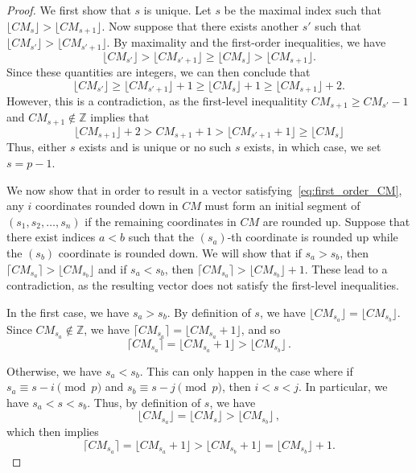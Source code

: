 \documentclass[12pt]{amsart}
\theoremstyle{definition}
\numberwithin{equation}{section}
\renewcommand\>{\rangle}
\newcommand\<{\langle}
\newcommand\0{\mathbf{0}}
\newcommand\ZZ{\mathbb{Z}}
\begin{document}
\begin{proof}
	We first show that $s$ is unique. Let $s$ be the maximal index such that $\lfloor CM_{s} \rfloor > \lfloor CM_{s+1} \rfloor$. Now suppose that there exists another $s'$ such that $\lfloor CM_{s'} \rfloor > \lfloor CM_{s'+1} \rfloor$. By maximality and the first-order inequalities, we have 
	\[\lfloor CM_{s'} \rfloor > \lfloor CM_{s'+1} \rfloor \geq \lfloor CM_{s} \rfloor > \lfloor CM_{s+1} \rfloor . \]
	Since these quantities are integers, we can then conclude that 
	\[
	\lfloor CM_{s'} \rfloor \geq \lfloor CM_{s'+1}\rfloor + 1 \geq \lfloor CM_{s}\rfloor  + 1 \geq \lfloor CM_{s+1}\rfloor + 2.\]
	However, this is a contradiction, as the first-level inequalitity $CM_{s+1} \geq CM_{s'} - 1$ and $CM_{s+1}\notin \ZZ$ implies that
	\[
	\lfloor CM_{s+1} \rfloor + 2  > CM_{s+1}+1 >  \lfloor CM_{s'+1} +1 \rfloor  \geq \lfloor CM_{s}\rfloor 
	\]
	Thus, either $s$ exists and is unique or no such $s$ exists, in which case, we set $s = p-1$.
	
	We now show that in order to result in a vector satisfying~\eqref{eq:first_order_CM}, any $i$ coordinates rounded down in $CM$ must form an initial segment of $(s_1, s_2, \dots, s_n)$ if the remaining coordinates in $CM$ are rounded up. 
	Suppose that there exist indices $a < b$ such that the $(s_a)$-th coordinate is rounded up while the $(s_b)$ coordinate is rounded down. 
	We will show that if $s_a > s_b$, then $\lceil CM_{s_a} \rceil > \lfloor CM_{s_b} \rfloor$ and if $s_a < s_b$, then $\lceil CM_{s_a} \rceil > \lfloor CM_{s_b} \rfloor + 1$. 
	These lead to a contradiction, as the resulting vector does not satisfy the first-level inequalities. 
	
	In the first case, we have $s_a > s_b$. By definition of $s$, we have $\lfloor CM_{s_a} \rfloor = \lfloor CM_{s_b} \rfloor$.
	Since $CM_{s_a} \notin \ZZ$, we have $\lceil CM_{s_a} \rceil = \lfloor CM_{s_a} + 1 \rfloor$, and so
	\[\lceil CM_{s_a} \rceil = \lfloor CM_{s_a} + 1 \rfloor > \lfloor CM_{s_b} \rfloor \, .\]
	
	Otherwise, we have $s_a < s_b$. This can only happen in the case where if $s_a \equiv s- i \pmod p$ and $s_b \equiv s-j \pmod p$, then $i < s < j$. In particular, we have $s_a < s < s_b$. Thus, by definition of $s$, we have 
	\[\lfloor CM_{s_a} \rfloor = \lfloor CM_{s} \rfloor > \lfloor CM_{s_b} \rfloor \, , \]
	which then implies
	\[\lceil CM_{s_a} \rceil = \lfloor CM_{s_a} + 1 \rfloor > \lfloor CM_{s_b} + 1 \rfloor = \lfloor CM_{s_b} \rfloor + 1.\]
\end{proof}
\end{document}
